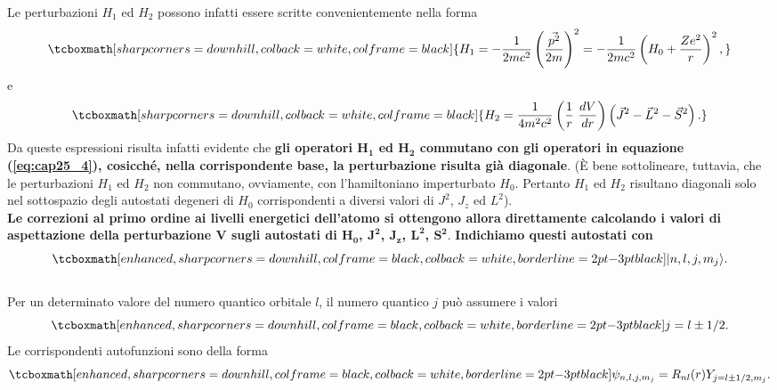 Le perturbazioni $H_1$ ed $H_2$ possono infatti essere scritte convenientemente nella forma
	\begin{equation}
	\label{eq:cap25_5}
		\tcboxmath[sharp corners=downhill, colback=white, colframe=black]{
			H_1=-\frac{1}{2mc^2} \left( \frac{\vec{p^2}}{2m} \right)^2 = -\frac{1}{2mc^2} \left( H_0+\frac{Ze^2}{r} \right)^2 ,
			}
	\end{equation}
e
	\begin{equation}
	\label{eq:cap25_6}
		\tcboxmath[sharp corners=downhill, colback=white, colframe=black]{
			H_2=\frac{1}{4m^2c^2} \left( \frac{1}{r} \ \frac{dV}{dr} \right) \left(\vec{J}^2-\vec{L}^2-\vec{S}^2 \right) .
			}
	\end{equation}
Da queste espressioni risulta infatti evidente che \textbf{gli operatori $\boldsymbol{H_1}$ ed $\boldsymbol{H_2}$ commutano con gli operatori in equazione (\ref{eq:cap25_4}), cosicché, nella corrispondente base, la perturbazione risulta già diagonale}. (È bene sottolineare, tuttavia, che le perturbazioni $H_1$ ed $H_2$ non commutano, ovviamente, con l'hamiltoniano imperturbato $H_0$. Pertanto $H_1$ ed $H_2$ risultano diagonali solo nel sottospazio degli autostati degeneri di $H_0$ corrispondenti a diversi valori di $J^2$, $J_z$ ed $L^2$). \\

\textbf{Le correzioni al primo ordine ai livelli energetici dell'atomo si ottengono allora direttamente calcolando i valori di aspettazione della perturbazione $\boldsymbol{V}$ sugli autostati di $\boldsymbol{H_0}$, $\boldsymbol{J^2}$, $\boldsymbol{J_z}$, $\boldsymbol{L^2}$, $\boldsymbol{S^2}$}. \textbf{Indichiamo questi autostati con}
	\begin{equation} 
		\tcboxmath[enhanced, sharp corners=downhill, colframe=black, colback=white, borderline={2pt}{-3pt}{black}]{
			| n,l,j,m_j \rangle .
			}
	\end{equation}\\
	
Per un determinato valore del numero quantico orbitale $l$, il numero quantico $j$ può assumere i valori
	\begin{equation} 
		\tcboxmath[enhanced, sharp corners=downhill, colframe=black, colback=white, borderline={2pt}{-3pt}{black}]{
			j=l\pm1/2 .
			}
	\end{equation}
Le corrispondenti autofunzioni sono della forma
	\begin{equation} 
		\tcboxmath[enhanced, sharp corners=downhill, colframe=black, colback=white, borderline={2pt}{-3pt}{black}]{		\psi_{n,l,j,m_j}=R_{nl}(r)Y_{j=l\pm1/2,m_j} .
		}
	\end{equation}\\
	
